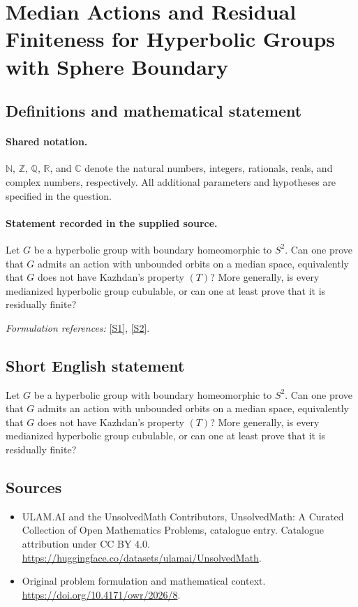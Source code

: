 \documentclass[11pt]{article}
\newcommand{\sref}[2]{\hyperlink{source:#1:#2}{[S#2]}}
\begin{document}
\section{Median Actions and Residual Finiteness for Hyperbolic Groups with Sphere Boundary}\label{statement}

\subsection{Definitions and mathematical statement}

\paragraph{Shared notation.}$\mathbb N$, $\mathbb Z$, $\mathbb Q$, $\mathbb R$, and $\mathbb C$ denote the natural numbers, integers, rationals, reals, and complex numbers, respectively. All additional parameters and hypotheses are specified in the question.


\paragraph{Statement recorded in the supplied source.}
Let $G$ be a hyperbolic group with boundary homeomorphic to $S^2$. Can one prove that $G$ admits an action with unbounded orbits on a median space, equivalently that $G$ does not have Kazhdan's property $(T)$? More generally, is every medianized hyperbolic group cubulable, or can one at least prove that it is residually finite?
\par\smallskip\textit{Formulation references:} \sref{statement}{1}, \sref{statement}{2}.
\subsection{Short English statement}
Let $G$ be a hyperbolic group with boundary homeomorphic to $S^2$. Can one prove that $G$ admits an action with unbounded orbits on a median space, equivalently that $G$ does not have Kazhdan's property $(T)$? More generally, is every medianized hyperbolic group cubulable, or can one at least prove that it is residually finite?
\subsection{Sources}
\begin{itemize}
\item[\hypertarget{source:statement:1}{S1}] ULAM.AI and the UnsolvedMath Contributors, UnsolvedMath: A Curated Collection of Open Mathematics Problems, catalogue entry. Catalogue attribution under CC BY 4.0.
\url{https://huggingface.co/datasets/ulamai/UnsolvedMath}.
\item[\hypertarget{source:statement:2}{S2}] Original problem formulation and mathematical context.
\url{https://doi.org/10.4171/owr/2026/8}.
\end{itemize}
\label{end:statement}
\end{document}
